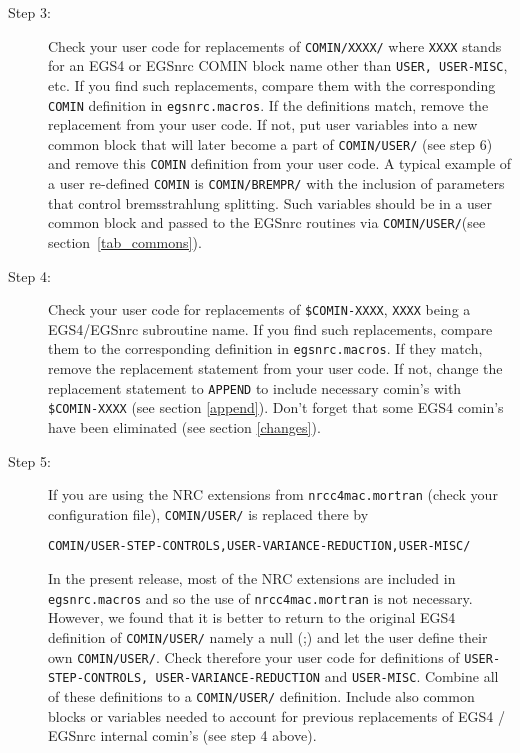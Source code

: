 \begin{description}
\item[Step 3:]
Check your user code for replacements of {\tt COMIN/XXXX/}
where {\tt XXXX} stands for an EGS4 or EGSnrc COMIN block name other than
{\tt USER, USER-MISC}, etc. If you find such replacements,
compare them with the corresponding {\tt COMIN} definition
in {\tt egsnrc.macros}. If the definitions match, remove
the replacement from your user code. If not, put user variables
into a new common block that will later become a part of
{\tt COMIN/USER/} (see step 6) and remove this {\tt COMIN}
definition from your user code. A typical example of a user re-defined
{\tt COMIN} is {\tt COMIN/BREMPR/} with the inclusion of parameters
that control bremsstrahlung splitting. Such variables should be
in a user common block and passed to the EGSnrc routines via
{\tt COMIN/USER/}(see section~\ref{tab_commons}).

\item[Step 4:]
Check your user code for replacements of {\tt \$COMIN-XXXX},
{\tt XXXX} being a EGS4/EGSnrc subroutine name. If you find such
replacements, compare them to the corresponding definition
in {\tt egsnrc.macros}. If they match, remove the replacement
statement from your user code. If not, change the replacement
statement to {\tt APPEND} to include necessary comin's
with {\tt \$COMIN-XXXX} (see section \ref{append}). Don't forget
that some EGS4 comin's have been eliminated (see section \ref{changes}).

\item[Step 5:]
If you are using the NRC extensions from {\tt nrcc4mac.mortran}
(check your configuration file), {\tt COMIN/USER/} is
replaced there by
\begin{flushleft}
{\tt COMIN/USER-STEP-CONTROLS,USER-VARIANCE-REDUCTION,USER-MISC/}\\
\end{flushleft}
In the present release, most of the NRC extensions are included
in {\tt egsnrc.macros} and so the use of {\tt nrcc4mac.mortran} is
not necessary. However, we found that it is better to return
to the original EGS4 definition of {\tt COMIN/USER/} namely a null (;)
and let the user define their own {\tt COMIN/USER/}.
Check therefore your user code for definitions of
{\tt USER-STEP-CONTROLS, USER-VARIANCE-REDUCTION} and
{\tt USER-MISC}. Combine all of these definitions to a  {\tt COMIN/USER/}
definition. Include also common blocks or variables needed to account for
previous replacements of
EGS4 / EGSnrc internal comin's (see step 4 above).


\end{description}
